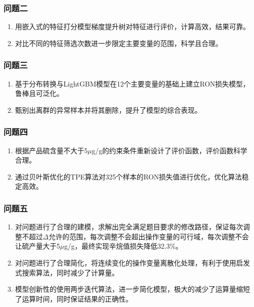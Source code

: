 \documentclass[bwprint]{gmcmthesis}
\begin{document}
\FloatBarrier
\subsubsection{问题二}
\begin{enumerate}[itemindent=20pt]
    \item 用嵌入式的特征打分模型梯度提升树对特征进行评价，计算高效，结果可靠。
    \item 对比不同的特征筛选次数进一步限定主要变量的范围，科学且合理。
\end{enumerate}


\FloatBarrier
\subsubsection{问题三}
\begin{enumerate}[itemindent=20pt]
    \item 基于分布转换与LightGBM模型在12个主要变量的基础上建立RON损失模型，鲁棒且可泛化。
    \item 甄别出离群的异常样本并将其删除，提升了模型的综合表现。
\end{enumerate}


\FloatBarrier
\subsubsection{问题四}
\begin{enumerate}[itemindent=20pt]
    \item 根据产品硫含量不大于5$\mu$g/g的约束条件重新设计了评价函数，评价函数科学合理。
    \item 通过贝叶斯优化的TPE算法对325个样本的RON损失值进行优化，优化算法稳定高效。
\end{enumerate}

\FloatBarrier
\subsubsection{问题五}
\begin{enumerate}[itemindent=20pt]
    \item 对问题进行了合理的建模，求解出完全满足题目要求的修改路径，保证每次调整不超过$\Delta$允许的范围，每次调整不会超出操作变量的可行域，每次调整不会让硫产量大于5$\mu$g/g，最终实现辛烷值损失降低32.3\%。
    \item 对问题进行了合理简化，将连续变化的操作变量离散化处理，有利于使用启发式搜索算法，同时减少了计算量。
    \item 模型创新性的使用两步迭代算法，进一步简化模型，极大的减少了运算量缩短了运算时间，同时保证结果的正确性。
\end{enumerate}
\end{document}
